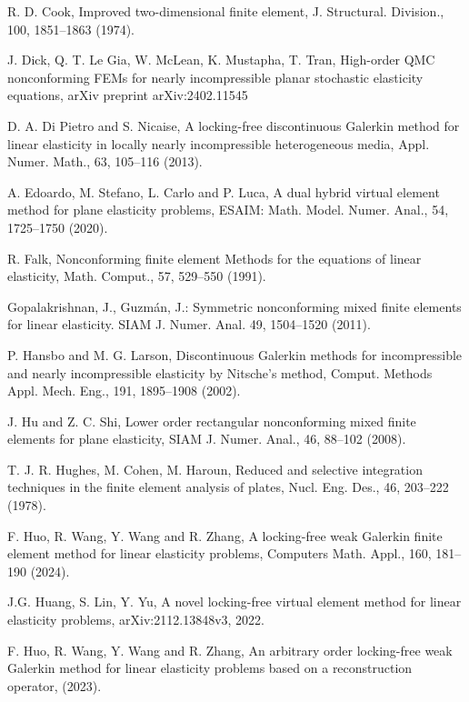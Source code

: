 \documentclass[11pt]{article}
\numberwithin{equation}{section}
\begin{document}
\begin{thebibliography}{99.}
 R. D. Cook,  Improved two-dimensional finite element, J. Structural. Division., 100, 1851--1863 (1974).

 J. Dick, Q. T. Le  Gia, W. McLean, K. Mustapha, T. Tran, High-order QMC nonconforming FEMs for nearly incompressible planar stochastic elasticity equations, arXiv preprint arXiv:2402.11545

 D. A.  Di Pietro and S. Nicaise, A locking-free discontinuous Galerkin method for linear elasticity in locally nearly incompressible heterogeneous media, Appl. Numer. Math., 63, 105--116 (2013).

 A. Edoardo, M. Stefano, L. Carlo and P. Luca,  A dual hybrid virtual element method for plane elasticity problems, ESAIM: Math. Model. Numer. Anal., 54, 1725--1750 (2020).

 R. Falk, Nonconforming finite element Methods for the equations of linear elasticity, Math. Comput., 57, 529--550 (1991).

 Gopalakrishnan, J., Guzm\'an, J.: Symmetric
nonconforming mixed finite elements for linear elasticity. SIAM J. Numer. Anal.
49, 1504–1520 (2011).

 P. Hansbo and  M. G. Larson, Discontinuous Galerkin methods for incompressible and nearly incompressible elasticity by Nitsche’s method, Comput. Methods Appl. Mech. Eng., 191, 1895--1908 (2002).

 J. Hu and Z. C.  Shi,  Lower order rectangular nonconforming mixed finite elements for plane elasticity, SIAM J. Numer. Anal., 46, 88--102 (2008).

  T. J. R. Hughes, M. Cohen, M. Haroun, Reduced and selective integration techniques in the finite element analysis of plates, Nucl. Eng. Des., 46, 203--222 (1978).

  F. Huo, R. Wang, Y. Wang and R. Zhang, A locking-free weak Galerkin finite element method for linear elasticity problems,  Computers   Math. Appl., 160, 181--190 (2024).

  J.G. Huang, S. Lin, Y. Yu, A novel locking-free virtual element method for linear elasticity problems, arXiv:2112.13848v3, 2022.

 F. Huo, R. Wang, Y. Wang and  R. Zhang, An arbitrary order locking-free weak Galerkin method for linear elasticity problems based on a reconstruction operator, (2023).



\end{thebibliography}
\end{document}
